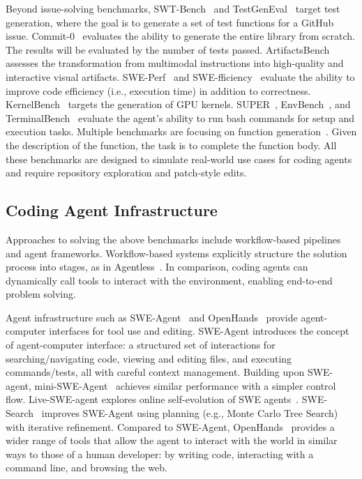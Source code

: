 \documentclass[12pt,openany]{cmuthesis}
\begin{document}
Beyond issue-solving benchmarks, SWT-Bench~\cite{swt-bench} and TestGenEval~\cite{testgeneval} target test generation, where the goal is to generate a set of test functions for a GitHub issue.
Commit-0~\cite{commit0} evaluates the ability to generate the entire library from scratch. The results will be evaluated by the number of tests passed.
ArtifactsBench~\cite{artifactsbench} assesses the transformation from multimodal instructions into high-quality and interactive visual artifacts.
SWE-Perf~\cite{sweperf} and SWE-fficiency~\cite{swefficiency} evaluate the ability to improve code efficiency (i.e., execution time) in addition to correctness.
KernelBench~\cite{kernelbench} targets the generation of GPU kernels.
SUPER~\cite{super}, EnvBench~\cite{envbench}, and TerminalBench~\cite{terminalbench} evaluate the agent's ability to run bash commands for setup and execution tasks.
Multiple benchmarks are focusing on function generation~\cite{classeval,repocoder,codereval,evocodebench,deveval,R2E,repost}. Given the description of the function, the task is to complete the function body.
All these benchmarks are designed to simulate real-world use cases for coding agents and require repository exploration and patch-style edits.

\subsection{Coding Agent Infrastructure}
Approaches to solving the above benchmarks include workflow-based pipelines and agent frameworks. 
Workflow-based systems explicitly structure the solution process into stages, as in Agentless~\cite{agentless}.
In comparison, coding agents can dynamically call tools to interact with the environment, enabling end-to-end problem solving.

Agent infrastructure such as SWE-Agent~\cite{sweagent} and OpenHands~\citep{openhands} provide agent-computer interfaces for tool use and editing. 
SWE-Agent introduces the concept of agent-computer interface: a structured set of interactions for searching/navigating code, viewing and editing files, and executing commands/tests, all with careful context management.
Building upon SWE-agent, mini-SWE-Agent~\cite{sweagent} achieves similar performance with a simpler control flow.
Live-SWE-agent explores online self-evolution of SWE agents~\citep{live-swe-agent}. 
SWE-Search~\citep{swe-search} improves SWE-Agent using planning (e.g., Monte Carlo Tree Search) with iterative refinement. 
Compared to SWE-Agent, OpenHands~\cite{openhands} provides a wider range of tools that allow the agent to interact with the world in similar ways to those of a human developer: by writing code, interacting with a command line, and browsing the web.
\end{document}
